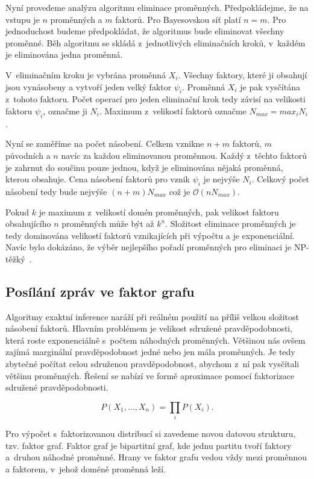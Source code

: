 Nyní provedeme analýzu algoritmu eliminace proměnných.
Předpokládejme, že na vstupu je $n$ proměnných a $m$ faktorů.
Pro Bayesovskou síť platí $n = m$.
Pro jednoduchost budeme předpokládat, že algoritmus bude eliminovat všechny proměnné.
Běh algoritmu se skládá z~jednotlivých eliminačních kroků, v~každém je eliminována jedna proměnná.

V~eliminačním kroku je vybrána proměnná $X_i$. 
Všechny faktory, které ji obsahují jsou vynásobeny a vytvoří jeden velký faktor $\psi_i$.
Proměnná $X_i$ je pak vysčítána z~tohoto faktoru.
Počet operací pro jeden eliminační krok tedy závisí na velikosti faktoru $\psi_i$, označme ji $N_i$.
Maximum z~velikostí faktorů označme $N_{max} = max_i N_i$.

Nyní se zaměříme na počet násobení.
Celkem vznikne $n+m$ faktorů, $m$ původních a $n$ navíc za každou eliminovanou proměnnou.
Každý z~těchto faktorů je zahrnut do součinu pouze jednou, když je eliminována nějaká proměnná, kterou obsahuje.
Cena násobení faktorů pro vznik $\psi_i$ je nejvýše $N_i$.
Celkový počet násobení tedy bude nejvýše $(n+m)N_{max}$ což je $\mathcal{O}(nN_{max})$.

Pokud $k$ je maximum z~velikostí domén proměnných, pak velikost faktoru obsahujícího $n$ proměnných může být až $k^n$.
Složitost eliminace proměnných je tedy dominována velikostí faktorů vznikajících při výpočtu a je exponenciální.
Navíc bylo dokázáno, že výběr nejlepšího pořadí proměnných pro eliminaci je NP-těžký~\cite{arnborg1987complexity}.

\subsection{Posílání zpráv ve faktor grafu}

Algoritmy exaktní inference naráží při reálném použití na příliš velkou složitost násobení faktorů.
Hlavním problémem je velikost sdružené pravděpodobnosti, která roste exponenciálně s~počtem náhodných proměnných.
Většinou nás ovšem zajímá marginální pravděpodobnost jedné nebo jen mála proměnných.
Je tedy zbytečné počítat celou sdruženou pravděpodobnost, abychom z~ní pak vysčítali většinu proměnných.
Řešení se nabízí ve formě aproximace pomocí faktorizace sdružené pravděpodobnosti.

\begin{equation*}
    P(X_1, \dots, X_n) = \prod_i P(X_i).
\end{equation*}

Pro výpočet s~faktorizovanou distribucí si zavedeme novou datovou strukturu, tzv. faktor graf.
Faktor graf je bipartitní graf, kde jednu partitu tvoří faktory a~druhou náhodné proměnné.
Hrany ve faktor grafu vedou vždy mezi proměnnou a faktorem, v~jehož doméně proměnná leží.

